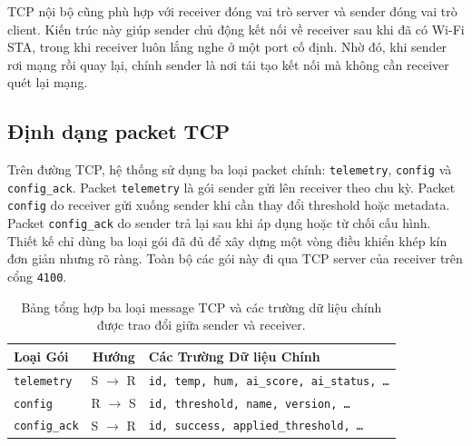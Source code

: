 \documentclass[12pt,a4paper]{report}
\begin{document}
TCP nội bộ cũng phù hợp với receiver đóng vai trò server và sender đóng vai trò client. Kiến trúc này giúp sender chủ động kết nối về receiver sau khi đã có Wi-Fi STA, trong khi receiver luôn lắng nghe ở một port cố định. Nhờ đó, khi sender rơi mạng rồi quay lại, chính sender là nơi tái tạo kết nối mà không cần receiver quét lại mạng.

\subsection{Định dạng packet TCP}
Trên đường TCP, hệ thống sử dụng ba loại packet chính: \texttt{telemetry}, \texttt{config} và \texttt{config\_ack}. Packet \texttt{telemetry} là gói sender gửi lên receiver theo chu kỳ. Packet \texttt{config} do receiver gửi xuống sender khi cần thay đổi threshold hoặc metadata. Packet \texttt{config\_ack} do sender trả lại sau khi áp dụng hoặc từ chối cấu hình. Thiết kế chỉ dùng ba loại gói đã đủ để xây dựng một vòng điều khiển khép kín đơn giản nhưng rõ ràng. Toàn bộ các gói này đi qua TCP server của receiver trên cổng \texttt{4100}.

\begin{table}[H]
\centering
\small
\renewcommand{\arraystretch}{1.3}
\begin{tabularx}{0.9\textwidth}{@{} l c X @{}}
\toprule
\textbf{Loại Gói} & \textbf{Hướng} & \textbf{Các Trường Dữ liệu Chính} \\
\midrule
\texttt{telemetry} & S $\rightarrow$ R & \texttt{id, temp, hum, ai\_score, ai\_status, \dots} \\
\texttt{config} & R $\rightarrow$ S & \texttt{id, threshold, name, version, \dots} \\
\texttt{config\_ack} & S $\rightarrow$ R & \texttt{id, success, applied\_threshold, \dots} \\
\bottomrule
\end{tabularx}
\caption{Bảng tổng hợp ba loại message TCP và các trường dữ liệu chính được trao đổi giữa sender và receiver.}
\label{fig:tcp-table}
\end{table}
\end{document}
